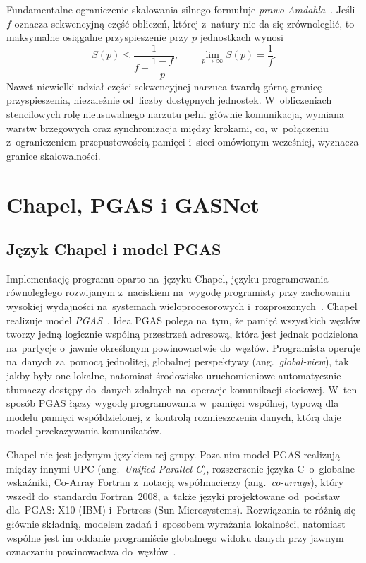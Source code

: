 Fundamentalne ograniczenie skalowania silnego formułuje \emph{prawo Amdahla}~\cite{amdahl}.
Jeśli \(f\) oznacza sekwencyjną część obliczeń, której z~natury nie da się zrównoleglić, to maksymalne osiągalne przyspieszenie przy \(p\) jednostkach
wynosi
\begin{equation}
  S(p) \le \frac{1}{f + \dfrac{1-f}{p}},
  \qquad
  \lim_{p\to\infty} S(p) = \frac{1}{f}.
  \label{eq:amdahl}
\end{equation}
Nawet niewielki udział części sekwencyjnej narzuca twardą górną granicę
przyspieszenia, niezależnie od~liczby dostępnych jednostek. W~obliczeniach
stencilowych rolę nieusuwalnego narzutu pełni głównie komunikacja, wymiana warstw brzegowych oraz synchronizacja między krokami,
co, w~połączeniu z~ograniczeniem przepustowością pamięci i~sieci omówionym
wcześniej, wyznacza granice skalowalności.

\section{Chapel, PGAS i GASNet}
\label{sec:chapel}

\subsection{Język Chapel i model PGAS}

Implementację programu oparto na~języku Chapel, języku programowania
równoległego rozwijanym z~naciskiem na~wygodę programisty przy zachowaniu
wysokiej wydajności na~systemach wieloprocesorowych i~rozproszonych~\cite{chapel-overview,chapel-book}. Chapel
realizuje model \emph{PGAS}~\cite{pgas,upc}. Idea PGAS polega na~tym, że pamięć
wszystkich węzłów tworzy jedną logicznie wspólną przestrzeń adresową, która
jest jednak podzielona na~partycje o~jawnie określonym powinowactwie do~węzłów.
Programista operuje na~danych za~pomocą jednolitej, globalnej perspektywy
(ang.\ \emph{global-view}), tak jakby były one lokalne, natomiast środowisko
uruchomieniowe automatycznie tłumaczy dostępy do~danych zdalnych na~operacje
komunikacji sieciowej. W~ten sposób PGAS łączy wygodę programowania w~pamięci
wspólnej, typową dla modelu pamięci współdzielonej, z~kontrolą rozmieszczenia
danych, którą daje model przekazywania komunikatów.

Chapel nie jest jedynym językiem tej grupy. Poza nim model PGAS realizują między innymi
UPC (ang.\ \emph{Unified Parallel C}), rozszerzenie języka C~o~globalne wskaźniki, Co-Array Fortran
z~notacją współmacierzy (ang.~\emph{co-arrays}), który wszedł do~standardu Fortran~2008, a~także języki projektowane
od~podstaw dla~PGAS: X10 (IBM) i~Fortress (Sun Microsystems). Rozwiązania te różnią się głównie
składnią, modelem zadań i~sposobem wyrażania lokalności, natomiast wspólne jest im oddanie programiście
globalnego widoku danych przy jawnym oznaczaniu powinowactwa do~węzłów~\cite{pgas,upc}.

